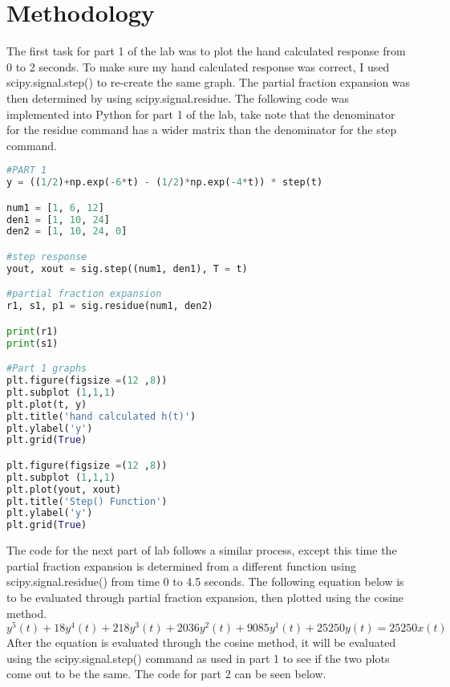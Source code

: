 \documentclass[12pt]{report}
\begin{document}
\section{Methodology}
\hspace{\parindent}The first task for part 1 of the lab was to plot the hand calculated response from 0 to 2 seconds. To make sure my hand calculated response was correct, I used scipy.signal.step() to re-create the same graph. The partial fraction expansion was then determined by using scipy.signal.residue. The following code was implemented into Python for part 1 of the lab, take note that the denominator for the residue command has a wider matrix than the denominator for the step command.
\begin{lstlisting}[language=Python, caption=Part 1 Code]
#PART 1
y = ((1/2)+np.exp(-6*t) - (1/2)*np.exp(-4*t)) * step(t)

num1 = [1, 6, 12]
den1 = [1, 10, 24]
den2 = [1, 10, 24, 0]

#step response
yout, xout = sig.step((num1, den1), T = t)

#partial fraction expansion
r1, s1, p1 = sig.residue(num1, den2)

print(r1)
print(s1)

#Part 1 graphs
plt.figure(figsize =(12 ,8))
plt.subplot (1,1,1)
plt.plot(t, y)
plt.title('hand calculated h(t)')
plt.ylabel('y')
plt.grid(True)

plt.figure(figsize =(12 ,8))
plt.subplot (1,1,1)
plt.plot(yout, xout)
plt.title('Step() Function')
plt.ylabel('y')
plt.grid(True)
\end{lstlisting}
\hspace{\parindent}The code for the next part of lab follows a similar process, except this time the partial fraction expansion is determined from a different function using scipy.signal.residue() from time 0 to 4.5 seconds. The following equation below is to be evaluated through partial fraction expansion, then plotted using the cosine method.
\[y^5(t)+18y^4(t)+218y^3(t)+2036y^2(t)+9085y^1(t)+25250y(t) = 25250x(t)\]
\hspace{\parindent}After the equation is evaluated through the cosine method, it will be evaluated using the scipy.signal.step() command as used in part 1 to see if the two plots come out to be the same. The code for part 2 can be seen below.
\end{document}
